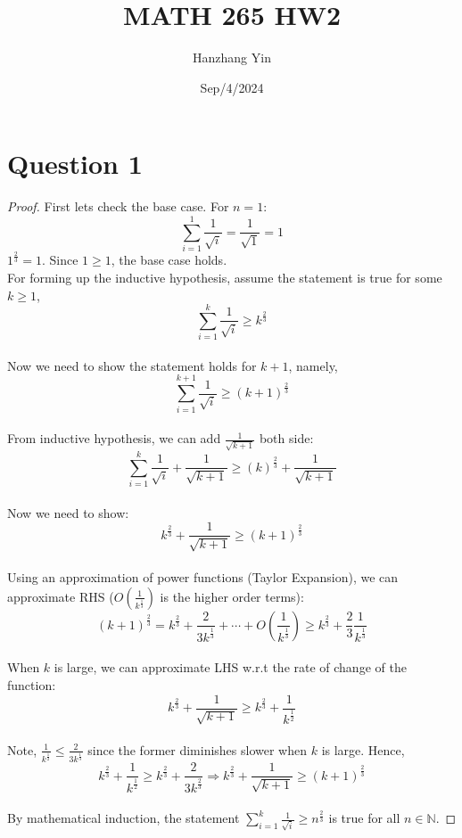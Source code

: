 \documentclass{article}
\title{MATH 265 HW2}
\author{Hanzhang Yin}
\date{Sep/4/2024}
\begin{document}
\maketitle

\section*{Question 1}
\begin{proof}
    First lets check the base case. For $n = 1$: 
    \[ \sum_{i=1}^{1} \frac{1}{\sqrt{i}} = \frac{1}{\sqrt{1}} = 1 \]
    $1^{\frac{2}{3}} = 1$. Since $1 \geq 1$, the base case holds.
    \\
    For forming up the inductive hypothesis, assume the statement is true for some $k \geq 1$, 
    \[ \sum_{i=1}^{k} \frac{1}{\sqrt{i}} \geq k^{\frac{2}{3}}  \]
    \\
    Now we need to show the statement holds for $k + 1$, namely, 
    \[ \sum_{i=1}^{k+1} \frac{1}{\sqrt{i}} \geq (k + 1)^{\frac{2}{3}} \]
    \\
    From inductive hypothesis, we can add $\frac{1}{\sqrt{k+1}}$ both side:
    \[ \sum_{i=1}^{k} \frac{1}{\sqrt{i}} + \frac{1}{\sqrt{k + 1}} \geq (k)^{\frac{2}{3}} + \frac{1}{\sqrt{k + 1}} \]
    \\
    Now we need to show:
    \[ k^{\frac{2}{3}} + \frac{1}{\sqrt{k + 1}} \geq (k + 1)^{\frac{2}{3}} \]
    \\
    Using an approximation of power functions (Taylor Expansion), we can approximate RHS ($O \left( \frac{1}{k^{\frac{1}{3}}} \right)$ is the higher order terms): 
    \[ (k + 1)^{\frac{2}{3}} = k^{\frac{2}{3}} + \frac{2}{3k^{\frac{1}{3}}} + \cdots + O \left( \frac{1}{k^{\frac{1}{3}}} \right) \geq k^{\frac{2}{3}} + \frac{2}{3} \frac{1}{k^{\frac{1}{3}}} \]
    \\
    When $k$ is large, we can approximate LHS w.r.t the rate of change of the function:
    \[ k^{\frac{2}{3}} + \frac{1}{\sqrt{k + 1}} \geq k^{\frac{2}{3}} + \frac{1}{k^{\frac{1}{2}}} \]
    \\
    Note, \( \frac{1}{k^{\frac{1}{2}}} \leq \frac{2}{3k^{\frac{1}{3}}} \) since the former diminishes slower when $k$ is large. Hence,
    \[ k^{\frac{2}{3}} + \frac{1}{k^{\frac{1}{2}}} \geq k^{\frac{2}{3}} + \frac{2}{3 k^{\frac{2}{3}}} \Rightarrow k^{\frac{2}{3}} + \frac{1}{\sqrt{k + 1}} \geq (k + 1)^{\frac{2}{3}} \]
    \\
    By mathematical induction, the statement \( \sum_{i=1}^{k} \frac{1}{\sqrt{i}} \geq n^{\frac{2}{3}} \) is true for all $n \in \mathbb{N}$.
\end{proof}
\end{document}

